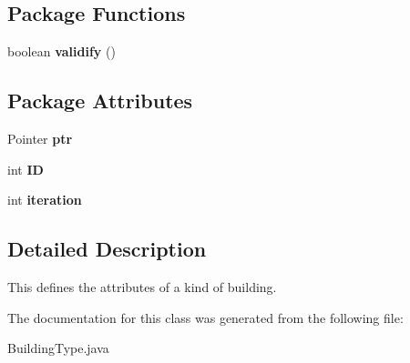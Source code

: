 \subsection*{Package Functions}
\begin{CompactItemize}
\item 
\hypertarget{classBuildingType_161b130c1dfef05ff5243b369a54dbb7}{
boolean \textbf{validify} ()}
\label{classBuildingType_161b130c1dfef05ff5243b369a54dbb7}

\end{CompactItemize}
\subsection*{Package Attributes}
\begin{CompactItemize}
\item 
\hypertarget{classBuildingType_538b44c3095872777ba9b613607b7a1b}{
Pointer \textbf{ptr}}
\label{classBuildingType_538b44c3095872777ba9b613607b7a1b}

\item 
\hypertarget{classBuildingType_8a4ae8d54aac80e6bd903cacc4273930}{
int \textbf{ID}}
\label{classBuildingType_8a4ae8d54aac80e6bd903cacc4273930}

\item 
\hypertarget{classBuildingType_1e3547a6e0012aca6728f2e8a8ead941}{
int \textbf{iteration}}
\label{classBuildingType_1e3547a6e0012aca6728f2e8a8ead941}

\end{CompactItemize}


\subsection{Detailed Description}
This defines the attributes of a kind of building. 

The documentation for this class was generated from the following file:\begin{CompactItemize}
\item 
BuildingType.java\end{CompactItemize}
